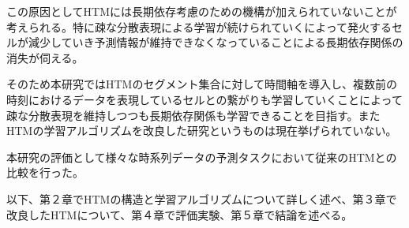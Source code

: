 この原因としてHTMには長期依存考慮のための機構が加えられていないことが考えられる。特に疎な分散表現による学習が続けられていくによって発火するセルが減少していき予測情報が維持できなくなっていることによる長期依存関係の消失が伺える。

そのため本研究ではHTMのセグメント集合に対して時間軸を導入し、複数前の時刻におけるデータを表現しているセルとの繋がりも学習していくことによって疎な分散表現を維持しつつも長期依存関係も学習できることを目指す。またHTMの学習アルゴリズムを改良した研究というものは現在挙げられていない。

本研究の評価として様々な時系列データの予測タスクにおいて従来のHTMとの比較を行った。

以下、第２章でHTMの構造と学習アルゴリズムについて詳しく述べ、第３章で改良したHTMについて、第４章で評価実験、第５章で結論を述べる。
